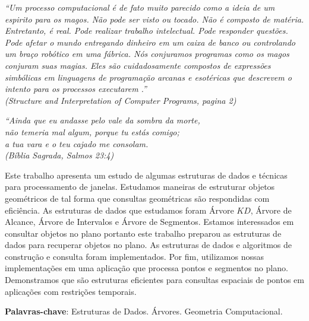 \begin{epigrafe}
    \vspace*{\fill}
    \begin{flushright}
		\textit{``Um processo computacional é de fato muito parecido como a ideia de um espirito para os magos. Não pode ser visto ou tocado. Não é composto de matéria. Entretanto, é real. Pode realizar trabalho intelectual. Pode responder questões. Pode afetar o mundo entregando dinheiro em um caixa de banco ou controlando um braço robótico em uma fábrica. Nós conjuramos programas como os magos conjuram suas magias. Eles são cuidadosamente compostos de expressões simbólicas em linguagens de programação arcanas e esotéricas que descrevem o intento para os processos executarem .'' \\
		(Structure and Interpretation of Computer Programs, pagina 2)}
	\end{flushright}
	\begin{flushright}
		\textit{``Ainda que eu andasse pelo vale da sombra da morte, \\
		não temeria mal algum, porque tu estás comigo;\\
		a tua vara e o teu cajado me consolam.\\
		(Bíblia Sagrada, Salmos 23:4)}
	\end{flushright}
\end{epigrafe}

%

\setlength{\absparsep}{18pt} %
\begin{resumo}
	\SingleSpacing
	Este trabalho apresenta um estudo de algumas estruturas de dados e técnicas para processamento de janelas. Estudamos maneiras de estruturar objetos geométricos de tal forma que consultas geométricas são respondidas com eficiência. As estruturas de dados que estudamos foram Árvore $KD$, Árvore de Alcance, Árvore de Intervalos e Árvore de Segmentos. Estamos interessados em consultar objetos no plano portanto este trabalho preparou as estruturas de dados para recuperar objetos no plano. As estruturas de dados e algoritmos de construção e consulta foram implementados. Por fim, utilizamos nossas implementações em uma aplicação que processa pontos e segmentos no plano. Demonstramos que são estruturas eficientes para consultas espaciais de pontos em aplicações com restrições temporais.

	\textbf{Palavras-chave}: Estruturas de Dados. Árvores. Geometria Computacional.
\end{resumo}

